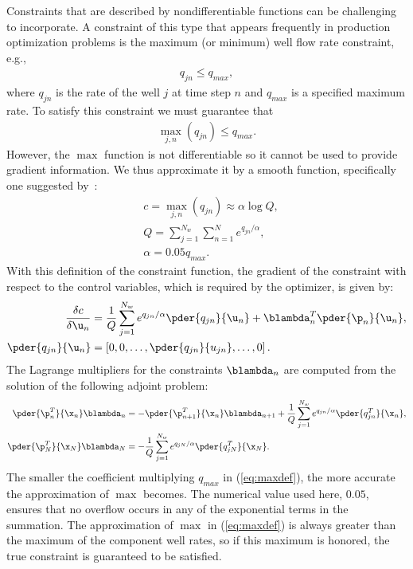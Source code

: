 Constraints that are described by nondifferentiable functions can be challenging
to incorporate. A constraint of this type that appears frequently in production
optimization problems is the maximum (or minimum) well flow rate constraint,
e.g.,
%
\begin{align}
q_{jn} \leq q_{max},
\end{align}
%
where $q_{jn}$ is the rate of the well $j$ at time step $n$ and $q_{max}$ is a specified maximum rate.
To satisfy this constraint we must guarantee that
\begin{align}
\max_{j,n}{(q_{jn})} \leq q_{max}.
\end{align}
However, the $\max$ function is not differentiable 
so it cannot be used to provide
gradient information.  We thus approximate it by a smooth
function, specifically one suggested by~\cite{Bertsekas}:
%
\begin{align} \label{eq:maxdef} &c = \max_{j,n}(q_{jn}) \approx \alpha
\log{Q}, \nonumber \\
&Q = \sum_{j=1}^{N_w}\sum_{n=1}^{N} e^{q_{jn}/\alpha}, \\ 
&\alpha = 0.05 q_{max}. \end{align}
%
With this definition of the constraint
function, the gradient of the constraint with respect to the control variables,
  which is required by the optimizer, is given by:
\begin{align} \label{eq:constraintGradient} \frac{\delta c}{\delta \u_n} &=
\frac{1}{Q}\sum_{j=1}^{N_w} e^{q_{jn}/\alpha} \pder{q_{jn}}{\u_n} +\blambda^T_n\pder{\p_n}{\u_n},  
\nonumber \\
\pder{q_{jn}}{\u_{n}} &= \left [ 0, 0, \ldots, \pder{q_{jn}}{u_{jn}}, \ldots, 0 \right ].
\end{align}
%
The Lagrange multipliers for the constraints $\blambda_n$ are
computed from the solution of the following adjoint problem:
  \begin{align}
\label{eq:discreteODEConstraints}
 \pder{\p_n^T}{\x_n}  \blambda_n &= -
\pder{\p_{n+1}^T}{\x_n} \blambda_{n+1} + 
\frac{1}{Q}\sum_{j=1}^{N_w} e^{q_{jn}/\alpha} \pder{q^T_{jn}}{\x_n}, 
\\
\label{eq:discreteBCConstraints}
\pder{\p_N^T}{\x_N} \blambda_N &= -
\frac{1}{Q}\sum_{j=1}^{N_w} e^{q_{jN}/\alpha} \pder{q^T_{jN}}{\x_N}.
\end{align}
The smaller the coefficient multiplying $q_{max}$ in (\ref{eq:maxdef}), the more accurate the
approximation of $\max$ becomes. The numerical value used here, $0.05$, ensures
that no overflow occurs in any of the exponential terms in the summation. The
approximation of $\max$ in (\ref{eq:maxdef}) is always greater than the maximum
of the component well rates, so if this maximum is honored, the true constraint
is guaranteed to be satisfied.




